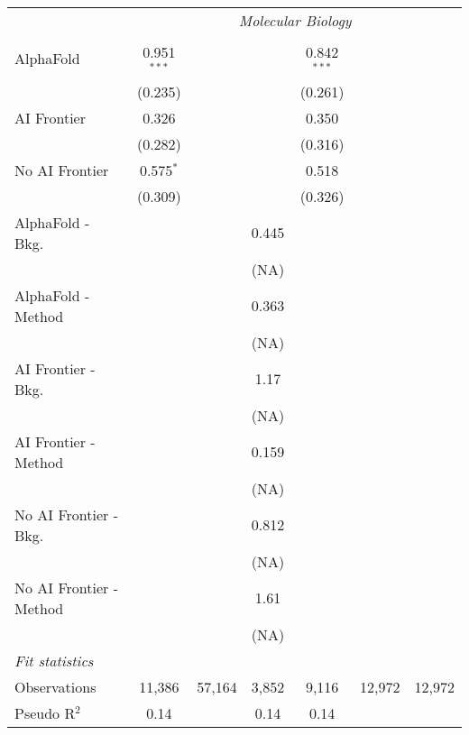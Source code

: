 \begin{tabular}{lcccccc}
 & \multicolumn{6}{c}{\textit{Molecular Biology}} \\ \\
   AlphaFold               & 0.951$^{***}$ &        &           & 0.842$^{***}$ &        &   \\   
                           & (0.235)       &        &           & (0.261)       &        &   \\   
   AI Frontier             & 0.326         &        &           & 0.350         &        &   \\   
                           & (0.282)       &        &           & (0.316)       &        &   \\   
   No AI Frontier          & 0.575$^{*}$   &        &           & 0.518         &        &   \\   
                           & (0.309)       &        &           & (0.326)       &        &   \\   
   AlphaFold - Bkg.        &               &        & 0.445     &               &        &   \\   
                           &               &        & (NA)      &               &        &   \\   
   AlphaFold - Method      &               &        & 0.363     &               &        &   \\   
                           &               &        & (NA)      &               &        &   \\   
   AI Frontier - Bkg.      &               &        & 1.17      &               &        &   \\   
                           &               &        & (NA)      &               &        &   \\   
   AI Frontier - Method    &               &        & 0.159     &               &        &   \\   
                           &               &        & (NA)      &               &        &   \\   
   No AI Frontier - Bkg.   &               &        & 0.812     &               &        &   \\   
                           &               &        & (NA)      &               &        &   \\   
   No AI Frontier - Method &               &        & 1.61      &               &        &   \\   
                           &               &        & (NA)      &               &        &   \\   
   \midrule
   \emph{Fit statistics}\\
   Observations            & 11,386        & 57,164 & 3,852     & 9,116         & 12,972 & 12,972\\  
   Pseudo R$^2$            & 0.14          &        & 0.14      & 0.14          &        & \\  
   

\end{tabular}
